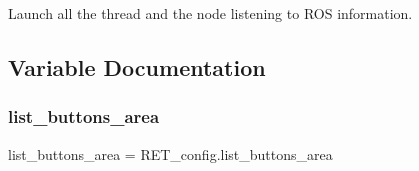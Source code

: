 Launch all the thread and the node listening to R\+OS information. 

\subsection{Variable Documentation}
\mbox{\label{namespaceRET__main_ac4848af5696d2d98e426d3d775d6964d}} 
\subsubsection{\texorpdfstring{list\+\_\+buttons\+\_\+area}{list\_buttons\_area}}
{\footnotesize\ttfamily list\+\_\+buttons\+\_\+area = R\+E\+T\+\_\+config.\+list\+\_\+buttons\+\_\+area}

